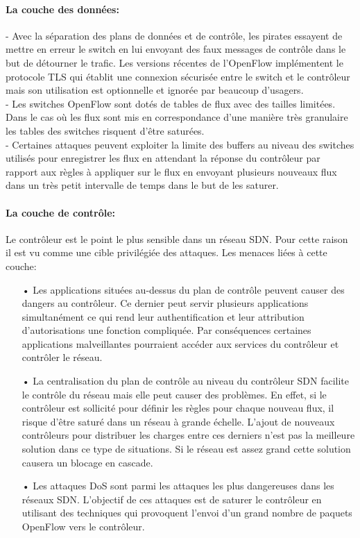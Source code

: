 \paragraph{La couche des données:\\}
- Avec la séparation des plans de données et de contrôle, les pirates essayent de mettre en erreur le switch en lui envoyant des faux messages de contrôle dans le but de détourner le trafic. Les versions récentes de l’OpenFlow implémentent le protocole TLS qui établit une connexion sécurisée entre le switch et le contrôleur mais son utilisation est optionnelle et ignorée par beaucoup d’usagers.\\
- Les switches OpenFlow sont dotés de tables de flux avec des tailles limitées. Dans le cas où les flux sont mis en correspondance d’une manière très granulaire les tables des switches risquent d’être saturées.\\
- Certaines attaques peuvent exploiter la limite des buffers au niveau des switches utilisés pour enregistrer les flux en attendant la réponse du contrôleur par rapport aux règles à appliquer sur le flux  en envoyant plusieurs nouveaux flux dans un très petit intervalle de temps dans le but de les saturer.

\paragraph{La couche de contrôle:} 
Le contrôleur est le point le plus sensible dans un réseau SDN. Pour cette raison il est vu comme une cible privilégiée des attaques. Les menaces liées à cette couche:\\
\begin{itemize}
\item[•]Les applications situées au-dessus du plan de contrôle peuvent causer des dangers au contrôleur. Ce dernier peut servir plusieurs applications simultanément ce qui rend leur authentification et leur attribution d’autorisations une fonction compliquée. Par conséquences certaines applications malveillantes pourraient accéder aux services du contrôleur et contrôler le réseau.\\
\item[•]La centralisation du plan de contrôle au niveau du contrôleur SDN facilite le contrôle du réseau mais elle peut causer des problèmes. En effet, si le contrôleur est sollicité pour définir les règles pour chaque nouveau flux, il risque d’être saturé dans un réseau à grande échelle. L’ajout de nouveaux contrôleurs pour distribuer les charges entre ces derniers n’est pas la meilleure solution dans ce type de situations. Si le réseau est assez grand cette solution causera un blocage en cascade.\\
\item[•]Les attaques DoS sont parmi les attaques les plus dangereuses dans les réseaux SDN. L’objectif de ces attaques est de saturer le contrôleur en utilisant des techniques qui provoquent l’envoi d’un grand nombre de paquets OpenFlow vers le contrôleur. 
\end{itemize}

